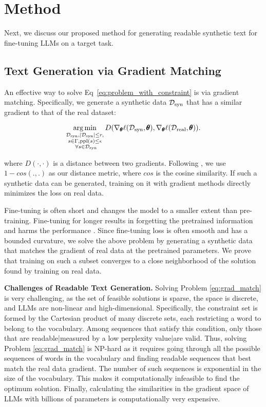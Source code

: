 \section{Method}\label{sec:method}
Next, we discuss our proposed method for generating readable synthetic text for fine-tuning LLMs on a target task. 

\subsection{Text Generation via Gradient Matching} 
An effective way to solve Eq~\ref{eq:problem_with_constraint} is via gradient matching. Specifically, we generate a synthetic data ${\mathcal{D}}_\text{syn}$ that has a similar gradient to that of the real dataset: %

\begin{equation}\label{eq:grad_match}
    \operatorname*{arg\,min}_{\substack{{\mathcal{D}}_\text{syn}, |{\mathcal{D}}_\text{syn}|\leq r, \\ s \in \Gamma, \text{ppl}(s) \leq \epsilon \\~\forall s\in {\mathcal{D}}_\text{syn}}}
    D(\nabla_{\pmb{\theta}} \ell({\mathcal{D}}_\text{syn},\pmb{\theta}),\nabla_{\pmb{\theta}}\ell({\mathcal{D}}_\text{real},\pmb{\theta})).
\end{equation}

where $D(\cdot, \cdot)$ is a distance between two gradients. Following \cite{deng2021tag, geiping2020inverting}, we use $1-cos(.,.)$ as our distance metric, where $cos$ is the cosine similarity. If such a synthetic data can be generated, training on it with gradient methods directly minimizes the loss on real data. %

Fine-tuning is often short and changes the model to a smaller extent than pre-training. Fine-tuning for longer results in forgetting the pretrained information and harms the performance \cite{gekhman2024does}. Since fine-tuning loss is often smooth and has a bounded curvature, we solve the above problem by generating a synthetic data that matches the gradient of real data at the pretrained parameters. We prove that training on such a subset converges to a close neighborhood of the solution found by training on real data.%

\textbf{Challenges of Readable Text Generation.}
Solving Problem \ref{eq:grad_match} is very challenging, as the set of feasible solutions is sparse, the space is discrete, and LLMs are non-linear and high-dimensional.
%
Specifically, the constraint set is formed by the Cartesian product of many discrete sets, each restricting a word to belong to the vocabulary. Among sequences that satisfy this condition, only those that are readable|measured by a low perplexity value|are valid. 
Thus, solving Problem \ref{eq:grad_match} is NP-hard as it requires going through all the possible sequences of words in the vocabulary and finding readable sequences that best match the real data gradient. The number of such sequences is exponential in the size of the vocabulary. This makes it computationally infeasible to find the optimum solution.
%
Finally, calculating the similarities in the %
gradient space of LLMs with billions of parameters is computationally very expensive. %



